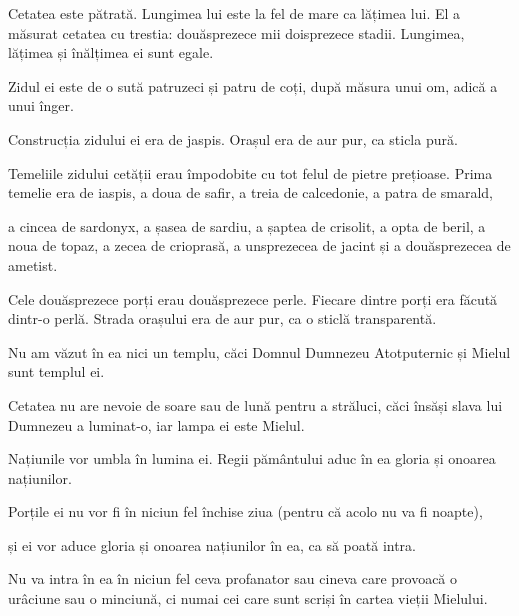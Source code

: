 {Cetatea este pătrată. Lungimea lui este la fel de mare ca lățimea lui. El a măsurat cetatea cu trestia: douăsprezece mii doisprezece stadii. Lungimea, lățimea și înălțimea ei sunt egale.

Zidul ei este de o sută patruzeci și patru de coți,
după măsura unui om, adică a unui înger.

Construcția zidului ei era de jaspis. Orașul era de aur pur, ca sticla pură.

Temeliile zidului cetății erau împodobite cu tot felul de pietre prețioase. Prima temelie era de iaspis, a doua de safir, a treia de calcedonie, a patra de smarald,

a cincea de sardonyx, a șasea de sardiu, a șaptea de crisolit, a opta de beril, a noua de topaz, a zecea de crioprasă, a unsprezecea de jacint și a douăsprezecea de ametist.

Cele douăsprezece porți erau douăsprezece perle. Fiecare dintre porți era făcută dintr-o perlă. Strada orașului era de aur pur, ca o sticlă transparentă.


\par }{\PP {}Nu am văzut în ea nici un templu, căci Domnul Dumnezeu Atotputernic și Mielul sunt templul ei.

Cetatea nu are nevoie de soare sau de lună pentru a străluci, căci însăși slava lui Dumnezeu a luminat-o, iar lampa ei este Mielul.

Națiunile vor umbla în lumina ei. Regii pământului aduc în ea gloria și onoarea națiunilor.

Porțile ei nu vor fi în niciun fel închise ziua (pentru că acolo nu va fi noapte),

și ei vor aduce gloria și onoarea națiunilor în ea, ca să poată intra.

Nu va intra în ea în niciun fel ceva profanator sau cineva care provoacă o urâciune sau o minciună, ci numai cei care sunt scriși în cartea vieții Mielului.



\par }
